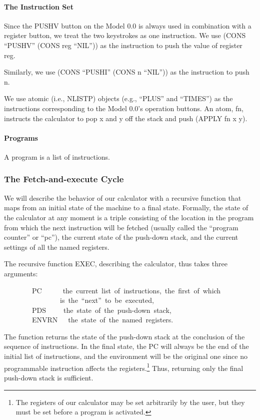 \documentclass[11pt]{book}
\newenvironment{pubasis}{\begin{flushleft}\ttfamily\small}{\normalsize\rmfamily\end{flushleft}}
\newcommand{\pubdefaulttextsize}{\large}
\begin{document}
\paragraph{The Instruction Set}
\pubdefaulttextsize
Since the PUSHV button on the Model 0.0 is always used in
combination with a register button, we treat the two
keystrokes as one instruction.  We use (CONS ``PUSHV'' (CONS
reg ``NIL'')) as the instruction to push the value of register
reg.

Similarly, we use (CONS ``PUSHI'' (CONS n ``NIL'')) as the
instruction to push n.

We use atomic (i.e., NLISTP) objects (e.g., ``PLUS'' and ``TIMES'') as the
instructions corresponding to the Model 0.0's operation
buttons.  An atom, fn, instructs the calculator to pop x and
y off the stack and push (APPLY fn x y).
\paragraph{Programs}
\pubdefaulttextsize
A program is a list
of instructions.
\subsubsection{The Fetch-and-execute Cycle}
\pubdefaulttextsize
We will describe the behavior of our calculator with a recursive
function that maps from an initial state of the machine to a
final state.  Formally, the state of the calculator at any moment
is  a triple consisting of
the location in the program from which the next instruction
will be fetched (usually called the ``program counter'' or ``pc''),
the current state of the push-down stack, and
the current settings of all the named registers.

The recursive function EXEC, describing the calculator, thus takes
three arguments:
\begin{pubasis}
~~~~~~~~PC~~~~~~the~current~list~of~instructions,~the~first~of~which\\
~~~~~~~~~~~~~~~~is~the~``next''~to~be~executed,\\
~~~~~~~~PDS~~~~~the~state~of~the~push-down~stack,\\
~~~~~~~~ENVRN~~~the~state~of~the~named~registers.\\
\end{pubasis}
The function returns the state of the push-down stack at the conclusion of the
sequence of instructions.  In the final state, the PC will always
be   the end of the initial list of instructions, and the environment will
be the original one since no programmable instruction affects the
registers.\footnote{The registers of our calculator may be set arbitrarily by the user, but they must be set before a program is activated.}
Thus, returning only the final push-down stack is sufficient.
\end{document}
